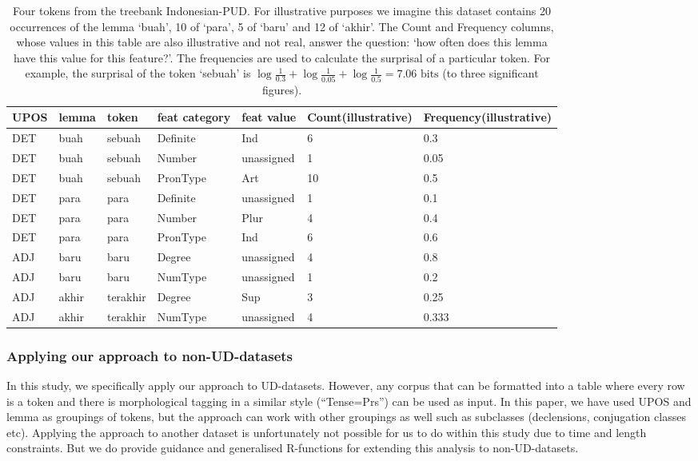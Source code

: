 \documentclass[USenglish]{article}
\begin{document}
\begin{table}[ht]
    \centering
    \caption{Four tokens from the treebank Indonesian-PUD. For illustrative purposes we imagine this dataset contains 20 occurrences of the lemma `buah', 10 of `para', 5 of `baru' and 12 of `akhir'. The Count and Frequency columns, whose values in this table are also illustrative and not real, answer the question: `how often does this lemma have this value for this feature?'. The frequencies are used to calculate the surprisal of a particular token. For example, the surprisal of the token `sebuah' is $\log{\frac{1}{0.3}}+\log{\frac{1}{0.05}}+\log{\frac{1}{0.5}} = 7.06\text{ bits}$ (to three significant figures).} %
    \label{tab:unassigned_ex_SPLIT}   
    \begin{tabular}{p{0.7cm}p{1cm}p{1.4cm}p{1.3cm}p{1.5cm}p{1.4cm}p{1.6cm}}
\toprule

UPOS&lemma	&token	&feat category & feat value & Count\newline (illustrative) & Frequency\newline (illustrative)	\\ \midrule

DET & buah & sebuah & Definite& Ind & 6 & 0.3\\
DET & buah & sebuah & Number& unassigned & 1 & 0.05\\
DET & buah & sebuah & PronType& Art & 10 & 0.5
\\\midrule
DET & para	& para	&Definite & unassigned & 1 & 0.1\\
DET & para	& para	&Number & Plur & 4 & 0.4\\
DET & para	& para	&PronType & Ind & 6 & 0.6
\\\midrule
ADJ&baru	&baru& Degree&unassigned & 4 & 0.8\\
ADJ&baru	&baru& NumType&unassigned & 1 & 0.2 \\\midrule
ADJ & akhir	&terakhir&	Degree& Sup & 3 & 0.25\\
ADJ & akhir	&terakhir&	NumType & unassigned & 4 & 0.333\\
\bottomrule
\end{tabular}
\end{table}


\FloatBarrier
\newpage
\subsubsection{Applying our approach to non-UD-datasets}
\label{appendix:applying_to_non_UD} 
In this study, we specifically apply our approach to UD-datasets. 
However, any corpus that can be formatted into a table where every row is a token and there is morphological tagging in a similar style (``Tense=Prs'') can be used as input. 
In this paper, we have used UPOS and lemma as groupings of tokens, but the approach can work with other groupings as well such as subclasses (declensions, conjugation classes etc).
Applying the approach to another dataset is unfortunately not possible for us to do within this study due to time and length constraints.
But we do provide guidance and generalised R-functions for extending this analysis to non-UD-datasets.
\end{document}
